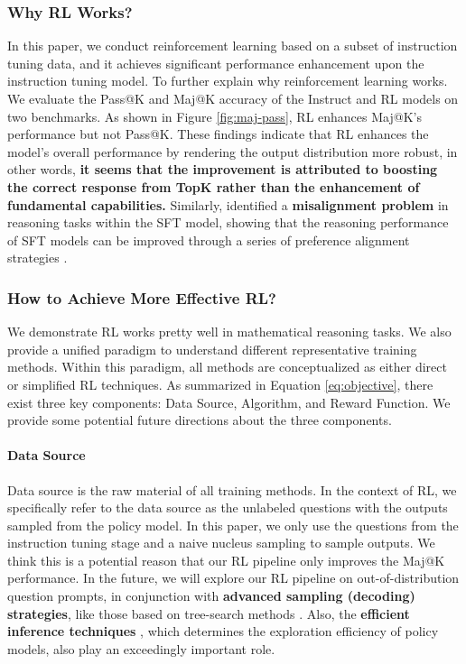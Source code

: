 \subsubsection{Why RL Works?} In this paper, we conduct reinforcement learning based on a subset of instruction tuning data, and it achieves significant performance enhancement upon the instruction tuning model. To further explain why reinforcement learning works. We evaluate the Pass@K and Maj@K accuracy of the Instruct and RL models on two benchmarks. As shown in Figure \ref{fig:maj-pass}, RL enhances Maj@K’s performance but not Pass@K. These findings indicate that RL enhances the model's overall performance by rendering the output distribution more robust, in other words, \textbf{it seems that the improvement is attributed to boosting the correct response from TopK rather than the enhancement of fundamental capabilities.} Similarly, \citep{wang2023making} identified a \textbf{misalignment problem} in reasoning tasks within the SFT model, showing that the reasoning performance of SFT models can be improved through a series of preference alignment strategies \citep{yuan2023rrhf,song2023preference,wang2023making}.

\subsubsection{How to Achieve More Effective RL?}
\label{sec:effec_rl}
We demonstrate RL works pretty well in mathematical reasoning tasks. We also provide a unified paradigm to understand different representative training methods. Within this paradigm, all methods are conceptualized as either direct or simplified  RL techniques. As summarized in Equation \ref{eq:objective}, there exist three key components: Data Source, Algorithm, and Reward Function. We provide some potential future directions about the three components.

\paragraph{Data Source} Data source is the raw material of all training methods. In the context of RL, we specifically refer to the data source as the unlabeled questions with the outputs sampled from the policy model. In this paper, we only use the questions from the instruction tuning stage and a naive nucleus sampling to sample outputs. We think this is a potential reason that our RL pipeline only improves the Maj@K performance. In the future, we will explore our RL pipeline on out-of-distribution question prompts, in conjunction with \textbf{advanced sampling (decoding) strategies}, like those based on tree-search methods \citep{yao2023tree}. Also, the  \textbf{efficient inference techniques} \citep{xia-etal-2023-speculative,leviathan2023fast,kwon2023efficient,xia2024unlocking}, which determines the exploration efficiency of policy models, also play an exceedingly important role.

